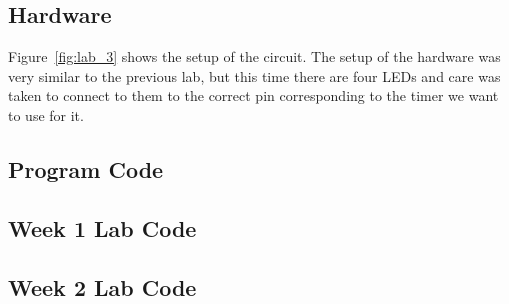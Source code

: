 \documentclass[12pt,titlepage]{article}
\begin{document}
\subsection{Hardware}
Figure~\ref{fig:lab_3} shows the setup of the circuit. The setup of the hardware was very similar to the previous lab, but this time there are four LEDs and care was taken to connect to them to the correct pin corresponding to the timer we want to use for it.
\newpage
\begin{appendices}
  \section{Program Code}
  \subsection{Week 1 Lab Code}
  \begin{minipage}{\linewidth}
    
  \end{minipage} 
  \subsection{Week 2 Lab Code}
    
\end{appendices}
\end{document}
